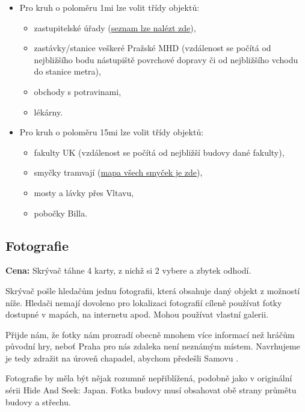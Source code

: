 \begin{itemize}
	\item Pro kruh o poloměru \dist1mi lze volit třídy objektů:
	\begin{itemize}
		\item zastupitelské úřady (\href{https://cs.wikipedia.org/wiki/Seznam_zastupitelsk\%C3\%BDch_\%C3\%BA\%C5\%99ad\%C5\%AF_v_\%C4\%8Cesk\%C3\%A9_republice}{seznam lze nalézt zde}),
		\item zastávky/stanice veškeré Pražské MHD (vzdálenost se počítá od nejbližšího bodu nástupiště povrchové dopravy či od nejbližšího vchodu do stanice metra),
		\item obchody s potravinami,
		\item lékárny.
	\end{itemize}
	\item Pro kruh o poloměru \dist15mi lze volit třídy objektů:
	\begin{itemize}
		\item fakulty UK (vzdálenost se počítá od nejbližší budovy dané fakulty),
		\item smyčky tramvají (\href{https://mapy.com/s/fobosuzuzu}{mapa všech smyček je zde}),
		\item mosty a lávky přes Vltavu,
		\item pobočky Billa.
	\end{itemize}
\end{itemize}

\subsection{Fotografie}

\textbf{Cena:} Skrývač táhne 4 karty, z nichž si 2 vybere a zbytek odhodí.

Skrývač pošle hledačům jednu fotografii, která obsahuje daný objekt z možností níže. Hledači nemají dovoleno pro lokalizaci fotografií cíleně používat fotky dostupné v mapách, na internetu apod. Mohou používat vlastní galerii.

\begin{reasoning}
	Přijde nám, že fotky nám prozradí obecně mnohem více informací než hráčům původní hry, neboť Praha pro nás zdaleka není neznámým místem. Navrhujeme je tedy zdražit na úroveň chapadel, abychom předešli Samovu .
\end{reasoning}

Fotografie by měla být nějak rozumně nepřiblížená, podobně jako v originální sérii Hide And Seek: Japan. Fotka budovy musí obsahovat obě strany průmětu budovy a střechu.

